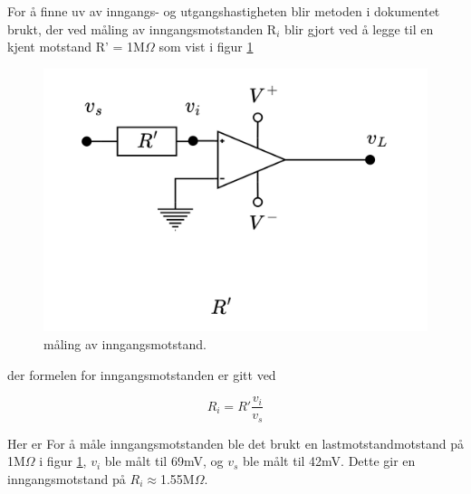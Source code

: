 For å finne uv av inngangs- og utgangshastigheten blir metoden i dokumentet \cite{ntnu_2022_ttt4265} brukt, der ved måling av inngangsmotstanden R$_i$ blir gjort ved å legge til en kjent motstand R' = 1M$\Omega$ som vist i figur \ref{fig:lastmot}

\begin{figure}[H]
    \centering
    \includegraphics[scale=0.1]{./Images/03Research/lastmot.png}
    \caption{måling av inngangsmotstand.\cite{pham_2022_selvlaget}}
    \label{fig:lastmot}
\end{figure}

der formelen for inngangsmotstanden er gitt ved

\begin{equation}
    R_i=R'\frac{v_i}{v_s}
\end{equation}

Her er For å måle inngangsmotstanden ble det brukt en lastmotstandmotstand på 1M$\Omega$ i figur \ref{fig:lastmot}, $v_i$ ble målt til 69mV, og $v_s$ ble målt til 42mV. Dette gir en inngangsmotstand på $R_i\approx$1.55M$\Omega$.

